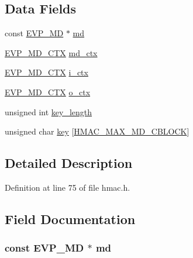 \subsection*{Data Fields}
\begin{DoxyCompactItemize}
\item 
const \hyperlink{crypto_2ossl__typ_8h_aac66cf010326fa9a927c2a34888f45d3}{E\+V\+P\+\_\+\+MD} $\ast$ \hyperlink{structhmac__ctx__st_a61b9561653786bff958a67f6c859f0e2}{md}
\item 
\hyperlink{crypto_2ossl__typ_8h_a69cda4d21bd068f01c469222c1dd92fe}{E\+V\+P\+\_\+\+M\+D\+\_\+\+C\+TX} \hyperlink{structhmac__ctx__st_aabd7ae5477403c34f89583c14535efb6}{md\+\_\+ctx}
\item 
\hyperlink{crypto_2ossl__typ_8h_a69cda4d21bd068f01c469222c1dd92fe}{E\+V\+P\+\_\+\+M\+D\+\_\+\+C\+TX} \hyperlink{structhmac__ctx__st_a2ee0679b5a06d99cd865b2e7cb85a581}{i\+\_\+ctx}
\item 
\hyperlink{crypto_2ossl__typ_8h_a69cda4d21bd068f01c469222c1dd92fe}{E\+V\+P\+\_\+\+M\+D\+\_\+\+C\+TX} \hyperlink{structhmac__ctx__st_af6600976d9ba868c372fd087fbfddaa7}{o\+\_\+ctx}
\item 
unsigned int \hyperlink{structhmac__ctx__st_a0e53c5d704f89ce75450ad59f6c81a1d}{key\+\_\+length}
\item 
unsigned char \hyperlink{structhmac__ctx__st_afdf91bfbe92eb0b23ae37bb94e1472a0}{key} \mbox{[}\hyperlink{include_2openssl_2hmac_8h_a70c2f521a62974fcae381df08f89c7a7}{H\+M\+A\+C\+\_\+\+M\+A\+X\+\_\+\+M\+D\+\_\+\+C\+B\+L\+O\+CK}\mbox{]}
\end{DoxyCompactItemize}


\subsection{Detailed Description}


Definition at line 75 of file hmac.\+h.



\subsection{Field Documentation}
\subsubsection[{\texorpdfstring{md}{md}}]{\setlength{\rightskip}{0pt plus 5cm}const {\bf E\+V\+P\+\_\+\+MD} $\ast$ md}\hypertarget{structhmac__ctx__st_a61b9561653786bff958a67f6c859f0e2}{}\label{structhmac__ctx__st_a61b9561653786bff958a67f6c859f0e2}


